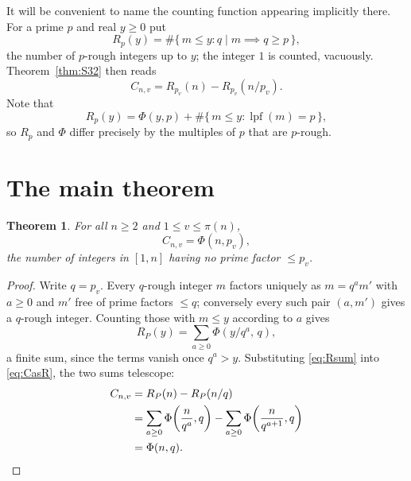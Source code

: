 \documentclass[a4paper,11pt,oneside,reqno]{amsart}
\theoremstyle{definition}
\theoremstyle{remark}
\theoremstyle{plain}
\newtheorem{theorem}[definition]{Theorem}
\newcommand{\lpf}{\operatorname{lpf}}
\begin{document}
It will be convenient to name the counting function appearing implicitly there.
For a prime \(p\) and real \(y \ge 0\) put
\begin{equation}
  R_p(y) = \#\{\,m \le y : q \mid m \implies q \ge p\,\},
\end{equation}
the number of \(p\)-rough integers up to \(y\); the integer \(1\) is counted,
vacuously. Theorem~\ref{thm:S32} then reads
\begin{equation}\label{eq:CasR}
  C_{n,v} = R_{p_v}(n)-R_{p_v}(n/p_v).
\end{equation}
Note that
\begin{equation}\label{eq:RvsPhi}
  R_p(y) = \Phi(y,p)+\#\{\,m \le y : \lpf(m) = p\,\},
\end{equation}
so \(R_p\) and \(\Phi\) differ precisely by the multiples of \(p\) that are
\(p\)-rough.

\section{The main theorem}\label{sec:main}

\begin{theorem}\label{thm:main}
  For all \(n \ge 2\) and \(1 \le v \le \pi(n)\),
  \[
    C_{n,v} = \Phi(n,p_v),
  \]
  the number of integers in \([1,n]\) having no prime factor \(\le p_v\).
\end{theorem}

\begin{proof}
  Write \(q = p_v\). Every \(q\)-rough integer \(m\) factors uniquely as
  \(m = q^{a}m'\) with \(a \ge 0\) and \(m'\) free of prime factors \(\le q\);
  conversely every such pair \((a,m')\) gives a \(q\)-rough integer. Counting
  those with \(m \le y\) according to \(a\) gives
  \begin{equation}\label{eq:Rsum}
    R_P(y) = \sum_{a \ge 0}\Phi\!\left(y/q^{a},\,q\right),
  \end{equation}
  a finite sum, since the terms vanish once \(q^{a} > y\). Substituting
  \eqref{eq:Rsum} into \eqref{eq:CasR}, the two sums telescope:
  \begin{align*}
    C_{n,v}&= R_P(n)-R_P(n/q)\\
           &= \sum_{a \ge 0}\Phi\!\left(\frac{n}{q^{a}},q\right)
            -\sum_{a \ge 0}\Phi\!\left(\frac{n}{q^{a+1}},q\right)\\
           &= \Phi(n,q).\qedhere
  \end{align*}
\end{proof}
\end{document}
